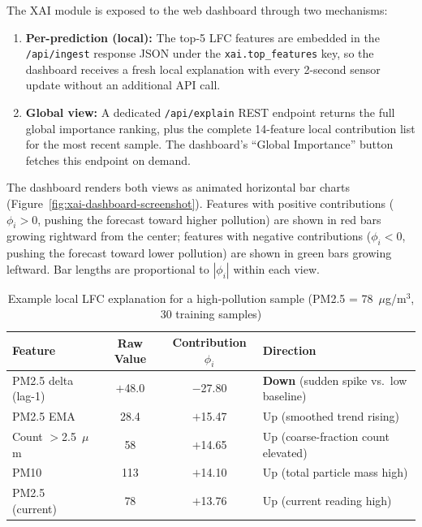 The XAI module is exposed to the web dashboard through two mechanisms:

\begin{enumerate}
    \item \textbf{Per-prediction (local):} The top-5 LFC features are embedded in the \texttt{/api/ingest} response JSON under the \texttt{xai.top\_features} key, so the dashboard receives a fresh local explanation with every 2-second sensor update without an additional API call.
    \item \textbf{Global view:} A dedicated \texttt{/api/explain} REST endpoint returns the full global importance ranking, plus the complete 14-feature local contribution list for the most recent sample. The dashboard's ``Global Importance'' button fetches this endpoint on demand.
\end{enumerate}

The dashboard renders both views as animated horizontal bar charts (Figure~\ref{fig:xai-dashboard-screenshot}). Features with positive contributions ($\phi_i > 0$, pushing the forecast toward higher pollution) are shown in red bars growing rightward from the center; features with negative contributions ($\phi_i < 0$, pushing the forecast toward lower pollution) are shown in green bars growing leftward. Bar lengths are proportional to $|\phi_i|$ within each view.

\begin{table}[htbp]
\centering
\caption{Example local LFC explanation for a high-pollution sample (PM2.5 = 78~$\mu$g/m$^3$, 30 training samples)}
\label{tab:xai-example}
\small
\begin{tabular}{@{}lccl@{}}
\toprule
\textbf{Feature} & \textbf{Raw Value} & \textbf{Contribution $\phi_i$} & \textbf{Direction} \\
\midrule
PM2.5 delta (lag-1) & $+$48.0 & $-$27.80 & \textbf{Down} (sudden spike vs.\ low baseline) \\
PM2.5 EMA           & 28.4    & $+$15.47 & Up   (smoothed trend rising) \\
Count $>$2.5~$\mu$m & 58      & $+$14.65 & Up   (coarse-fraction count elevated) \\
PM10                & 113     & $+$14.10 & Up   (total particle mass high) \\
PM2.5 (current)     & 78      & $+$13.76 & Up   (current reading high) \\
\bottomrule
\end{tabular}
\end{table}

